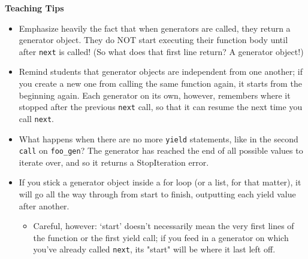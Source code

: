 \begin{blocksection}
\begin{guide}
\textbf{Teaching Tips}
\begin{itemize}
\item Emphasize heavily the fact that when generators are called, they return a generator object. They do NOT start executing their function body until after \texttt{next} is called! (So what does that first line return? A generator object!)
\item Remind students that generator objects are independent from one another; if you create a new one from calling the same function again, it starts from the beginning again. Each generator on its own, however, remembers where it stopped after the previous \texttt{next} call, so that it can resume the next time you call \texttt{next}.
\item What happens when there are no more \texttt{yield} statements, like in the second \texttt{call} on \texttt{foo\_gen}? The generator has reached the end of all possible values to iterate over, and so it returns a StopIteration error.
\item If you stick a generator object inside a for loop (or a list, for that matter), it will go all the way through from start to finish, outputting each yield value after another.
\begin{itemize}
\item Careful, however: `start' doesn't necessarily mean the very first lines of the function or the first yield call; if you feed in a generator on which you've already called \texttt{next}, its "start" will be where it last left off.
\end{itemize}
\end{itemize}
\end{guide}
\end{blocksection}